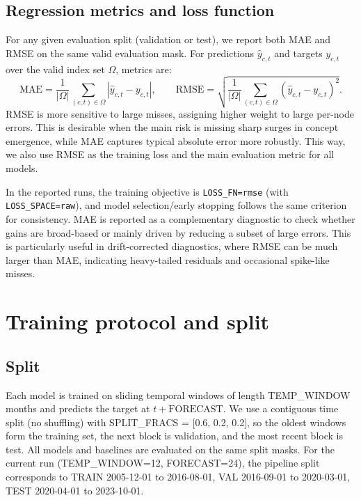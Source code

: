 \documentclass{article}
\begin{document}
\subsection{Regression metrics and loss function}
For any given evaluation split (validation or test), we report both MAE and RMSE on the same valid evaluation mask. For predictions $\hat{y}_{c,t}$ and targets $y_{c,t}$ over
the valid index set $\Omega$, metrics are:
\[
\mathrm{MAE}=\frac{1}{|\Omega|}\sum_{(c,t)\in\Omega}\left|\hat{y}_{c,t}-y_{c,t}\right|,
\qquad
\mathrm{RMSE}=\sqrt{\frac{1}{|\Omega|}\sum_{(c,t)\in\Omega}\left(\hat{y}_{c,t}-y_{c,t}\right)^2}.
\]
RMSE is more sensitive to large misses, assigning higher weight to large per-node errors. This is desirable when the main risk is missing sharp surges in concept emergence, while MAE captures typical absolute error more robustly.
This way, we also use RMSE as the training loss and the main evaluation metric for all models. 
\newline

In the reported runs, the training objective is \texttt{LOSS\_FN=rmse} (with \texttt{LOSS\_SPACE=raw}),
and model selection/early stopping follows the same criterion for consistency. MAE is reported as a
complementary diagnostic to check whether gains are broad-based or mainly driven by reducing a subset
of large errors. This is particularly useful in drift-corrected diagnostics, where RMSE can be much
larger than MAE, indicating heavy-tailed residuals and occasional spike-like misses.




\section{Training protocol and split}
\subsection{Split}
Each model is trained on sliding temporal windows of length
TEMP\_WINDOW months and predicts the target at $t+\text{FORECAST}$.
We use a contiguous time split (no shuffling) with SPLIT\_FRACS = [0.6, 0.2, 0.2],
so the oldest windows form the training set, the next block is validation, and the most recent
block is test. All models and baselines are evaluated on the same split masks.
For the current run (TEMP\_WINDOW=12, FORECAST=24), the pipeline split corresponds to
TRAIN 2005-12-01 to 2016-08-01, VAL 2016-09-01 to 2020-03-01, TEST 2020-04-01 to 2023-10-01.
\newline
\end{document}
